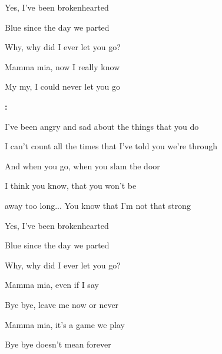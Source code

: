 \begin{song}
\smallskip

\begin{chorusbox}{\Bridge}
Yes, I've been brokenhearted \par
{}Blue since the day we parted \par
{} Why, why did I ever let you go? \par
{} Mamma mia,  now I really know \par
{} My my, I could never let you go \par
\end{chorusbox}

\bigskip

\Instrumental\textbf{:}     \par

\bigskip

I've been angry and sad about the things that you do \par
{}I can't count all the times that I've told you we're through \par
{}And when you go,  when you slam the door \par
{}I think you know,  that you won't be \par
away too long... You know that I'm not that strong  \par

\bigskip

\PrechorusAndChorus

\bigskip

Yes, I've been brokenhearted \par
{}Blue since the day we parted \par
{} Why, why did I ever let you go? \par

\bigskip

Mamma mia, even if I say \par
{} Bye bye, leave me now or never \par
{}Mamma mia, it's a game we play \par
{} Bye bye doesn't mean forever \par


\end{song}
